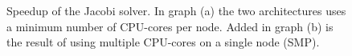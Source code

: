 \documentclass{sigplanconf}
\begin{document}
\begin{figure}[p]%
  \begin{center}%
    \caption{Speedup of the Jacobi solver. In graph (a) the two architectures uses a minimum number of CPU-cores per node. Added in graph (b) is the result of using multiple CPU-cores on a single node (SMP).}%
    \label{fig:JacobiScale}%
  \end{center}
\end{figure}
\end{document}
